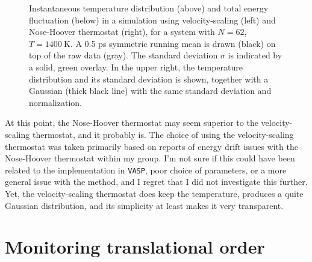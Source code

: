 \documentclass[11pt,bibliography=totoc,index=totoc]{scrbook}   %
\newcommand{\vasp}{{\texttt{VASP}}} %
\begin{document}
\begin{figure}[htbp]
  \centering
  \caption{
    Instantaneous temperature distribution (above) and total energy fluctuation (below) 
    in a simulation using velocity-scaling (left) and Nose-Hoover thermostat (right),
    for a system with $N=62$, $T=\SI{1400}{\kelvin}$.
    A 0.5 ps symmetric running mean is drawn (black) on top of the raw data (gray). 
    The standard deviation $\sigma$ is indicated by a solid, green overlay. 
    In the upper right, the temperature distribution and its standard deviation is shown, 
    together with a Gaussian (thick black line) with the same standard deviation and normalization.
   }
  \label{fig:md_test_temperature}
\end{figure}

At this point, the Nose-Hoover thermostat may seem superior to the velocity-scaling thermostat, 
and it probably is.
The choice of using the velocity-scaling thermostat was taken primarily based on reports of energy drift issues with the Nose-Hoover thermostat within my group. 
I'm not sure if this could have been related to the implementation in {\vasp}, poor choice of parameters, or a more general issue with the method, 
and I regret that I did not investigate this further.
Yet, the velocity-scaling thermostat does keep the temperature, produces a quite Gaussian distribution, and its simplicity at least makes it very transparent.



%
\section{Monitoring translational order}\label{sec:translational-order}
%
\end{document}
